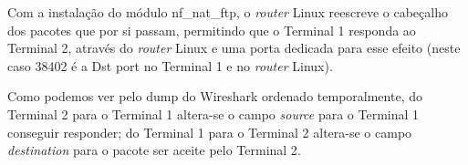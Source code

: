 Com a instalação do módulo \textsf{nf\_nat\_ftp}, o \textsf{\emph{router} Linux}
reescreve o cabeçalho dos pacotes que por si passam, permitindo que o
\textsf{Terminal 1} responda ao \textsf{Terminal 2}, através do 
\textsf{\emph{router} Linux} e uma porta dedicada para esse efeito 
(neste caso \textsf{38402} é a \textsf{Dst port} no \textsf{Terminal 1} e
no \textsf{\emph{router} Linux}).

Como podemos ver pelo dump do Wireshark ordenado temporalmente, do 
\textsf{Terminal 2} para o \textsf{Terminal 1} altera-se o campo 
\emph{source} para o \textsf{Terminal 1} conseguir responder; do 
\textsf{Terminal 1} para o \textsf{Terminal 2} altera-se o campo 
\emph{destination} para o pacote ser aceite pelo \textsf{Terminal 2}.
